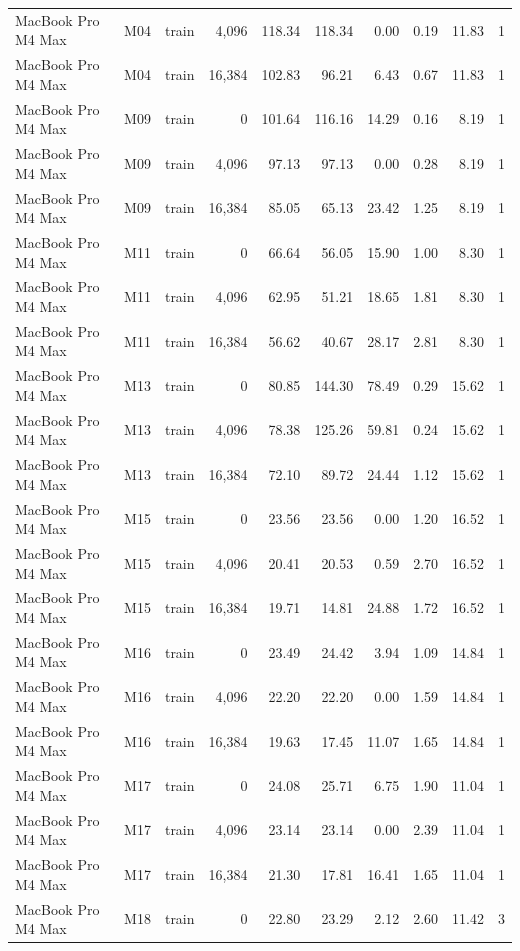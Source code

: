 \documentclass[10pt]{article}
\begin{document}
\begin{landscape}
\begin{longtable}{@{}l l l r r r r r r r@{}}
MacBook Pro M4 Max & M04 & train & 4,096 & 118.34 & 118.34 & 0.00 & 0.19 & 11.83 & 1 \\
MacBook Pro M4 Max & M04 & train & 16,384 & 102.83 & 96.21 & 6.43 & 0.67 & 11.83 & 1 \\
MacBook Pro M4 Max & M09 & train & 0 & 101.64 & 116.16 & 14.29 & 0.16 & 8.19 & 1 \\
MacBook Pro M4 Max & M09 & train & 4,096 & 97.13 & 97.13 & 0.00 & 0.28 & 8.19 & 1 \\
MacBook Pro M4 Max & M09 & train & 16,384 & 85.05 & 65.13 & 23.42 & 1.25 & 8.19 & 1 \\
MacBook Pro M4 Max & M11 & train & 0 & 66.64 & 56.05 & 15.90 & 1.00 & 8.30 & 1 \\
MacBook Pro M4 Max & M11 & train & 4,096 & 62.95 & 51.21 & 18.65 & 1.81 & 8.30 & 1 \\
MacBook Pro M4 Max & M11 & train & 16,384 & 56.62 & 40.67 & 28.17 & 2.81 & 8.30 & 1 \\
MacBook Pro M4 Max & M13 & train & 0 & 80.85 & 144.30 & 78.49 & 0.29 & 15.62 & 1 \\
MacBook Pro M4 Max & M13 & train & 4,096 & 78.38 & 125.26 & 59.81 & 0.24 & 15.62 & 1 \\
MacBook Pro M4 Max & M13 & train & 16,384 & 72.10 & 89.72 & 24.44 & 1.12 & 15.62 & 1 \\
MacBook Pro M4 Max & M15 & train & 0 & 23.56 & 23.56 & 0.00 & 1.20 & 16.52 & 1 \\
MacBook Pro M4 Max & M15 & train & 4,096 & 20.41 & 20.53 & 0.59 & 2.70 & 16.52 & 1 \\
MacBook Pro M4 Max & M15 & train & 16,384 & 19.71 & 14.81 & 24.88 & 1.72 & 16.52 & 1 \\
MacBook Pro M4 Max & M16 & train & 0 & 23.49 & 24.42 & 3.94 & 1.09 & 14.84 & 1 \\
MacBook Pro M4 Max & M16 & train & 4,096 & 22.20 & 22.20 & 0.00 & 1.59 & 14.84 & 1 \\
MacBook Pro M4 Max & M16 & train & 16,384 & 19.63 & 17.45 & 11.07 & 1.65 & 14.84 & 1 \\
MacBook Pro M4 Max & M17 & train & 0 & 24.08 & 25.71 & 6.75 & 1.90 & 11.04 & 1 \\
MacBook Pro M4 Max & M17 & train & 4,096 & 23.14 & 23.14 & 0.00 & 2.39 & 11.04 & 1 \\
MacBook Pro M4 Max & M17 & train & 16,384 & 21.30 & 17.81 & 16.41 & 1.65 & 11.04 & 1 \\
MacBook Pro M4 Max & M18 & train & 0 & 22.80 & 23.29 & 2.12 & 2.60 & 11.42 & 3 \\

\end{longtable}
\end{landscape}
\end{document}

